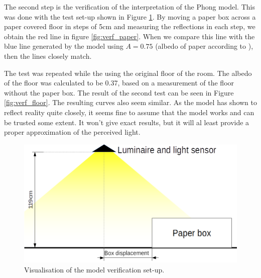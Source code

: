 The second step is the verification of the interpretation of the Phong model. This was done with the test set-up shown in Figure \ref{fig:VerificationSetup}. By moving a paper box across a paper covered floor in steps of 5cm and measuring the reflections in each step, we obtain the red line in figure \ref{fig:verf_paper}. When we compare this line with the blue line generated by the model using $A = 0.75$ (albedo of paper according to \cite{Albedo}), then the lines closely match.

The test was repeated while the using the original floor of the room. The albedo of the floor was calculated to be 0.37, based on a measurement of the floor without the paper box. The result of the second test can be seen in Figure \ref{fig:verf_floor}. The resulting curves also seem similar. As the model has shown to reflect reality quite closely, it seems fine to assume that the model works and can be trusted some extent. It won't give exact results, but it will al least provide a proper approximation of the perceived light.

\begin{figure}[]
	\centering
	\includegraphics[width=\textwidth]{pics/Verification_Situation.png}
	\caption{Visualisation of the model verification set-up.\label{fig:VerificationSetup}}
\end{figure}

